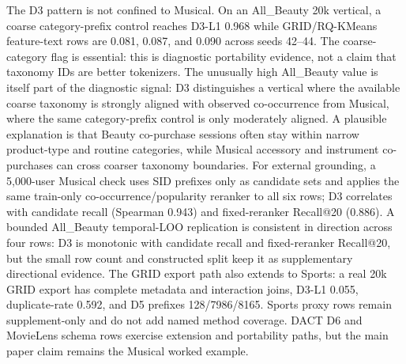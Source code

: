 The D3 pattern is not confined to Musical. On an All\_Beauty 20k vertical, a
coarse category-prefix control reaches D3-L1 0.968 while GRID/RQ-KMeans
feature-text rows are 0.081, 0.087, and 0.090 across seeds 42--44. The
coarse-category flag is essential: this is diagnostic portability evidence, not
a claim that taxonomy IDs are better tokenizers. The unusually high
All\_Beauty value is itself part of the diagnostic signal: D3 distinguishes a
vertical where the available coarse taxonomy is strongly aligned with observed
co-occurrence from Musical, where the same category-prefix control is only
moderately aligned. A plausible explanation is that Beauty co-purchase sessions
often stay within narrow product-type and routine categories, while Musical
accessory and instrument co-purchases can cross coarser taxonomy boundaries.
For external grounding, a 5,000-user Musical check uses SID prefixes only as
candidate sets and applies the same train-only co-occurrence/popularity reranker
to all six rows; D3 correlates with candidate recall (Spearman 0.943) and
fixed-reranker Recall@20 (0.886). A bounded All\_Beauty temporal-LOO
replication is consistent in direction across four rows: D3 is monotonic with
candidate recall and fixed-reranker Recall@20, but the small row count and
constructed split keep it as supplementary directional evidence. The GRID
export path also extends to Sports: a real 20k GRID export
has complete metadata and interaction joins, D3-L1 0.055, duplicate-\sid rate
0.592, and D5 prefixes 128/7986/8165. Sports proxy rows remain supplement-only
and do not add named method coverage. DACT D6 and MovieLens schema rows
exercise extension and portability paths, but the main paper claim remains the
Musical worked example.
